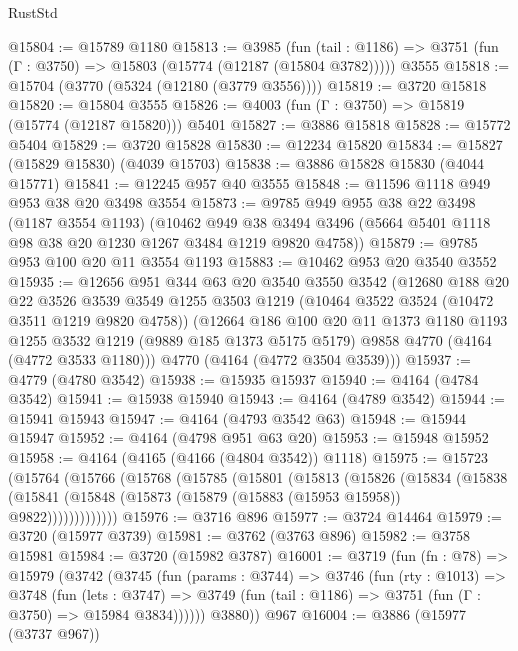 \begin{lexlean}{RustStd}
\begin{coremodule}
@15804 := @15789 @1180
@15813 := @3985
    (fun (tail : @1186) => @3751 (fun (Γ : @3750) => @15803 (@15774 (@12187 (@15804 @3782)))))
    @3555
@15818 := @15704 (@3770 (@5324 (@12180 (@3779 @3556))))
@15819 := @3720 @15818
@15820 := @15804 @3555
@15826 := @4003 (fun (Γ : @3750) => @15819 (@15774 (@12187 @15820))) @5401
@15827 := @3886 @15818
@15828 := @15772 @5404
@15829 := @3720 @15828
@15830 := @12234 @15820
@15834 := @15827 (@15829 @15830) (@4039 @15703)
@15838 := @3886 @15828 @15830 (@4044 @15771)
@15841 := @12245 @957 @40 @3555
@15848 := @11596 @1118 @949 @953 @38 @20 @3498 @3554
@15873 := @9785
    @949
    @955
    @38
    @22
    @3498
    (@1187 @3554 @1193)
    (@10462
      @949
      @38
      @3494
      @3496
      (@5664 @5401 @1118 @98 @38 @20 @1230 @1267 @3484 @1219 @9820 @4758))
@15879 := @9785 @953 @100 @20 @11 @3554 @1193
@15883 := @10462 @953 @20 @3540 @3552
@15935 := @12656
    @951
    @344
    @63
    @20
    @3540
    @3550
    @3542
    (@12680
      @188
      @20
      @22
      @3526
      @3539
      @3549
      @1255
      @3503
      @1219
      (@10464 @3522 @3524 (@10472 @3511 @1219 @9820 @4758))
      (@12664
        @186
        @100
        @20
        @11
        @1373
        @1180
        @1193
        @1255
        @3532
        @1219
        (@9889 @185 @1373 @5175 @5179)
        @9858
        @4770
        (@4164 (@4772 @3533 @1180)))
      @4770
      (@4164 (@4772 @3504 @3539)))
@15937 := @4779 (@4780 @3542)
@15938 := @15935 @15937
@15940 := @4164 (@4784 @3542)
@15941 := @15938 @15940
@15943 := @4164 (@4789 @3542)
@15944 := @15941 @15943
@15947 := @4164 (@4793 @3542 @63)
@15948 := @15944 @15947
@15952 := @4164 (@4798 @951 @63 @20)
@15953 := @15948 @15952
@15958 := @4164 (@4165 (@4166 (@4804 @3542)) @1118)
@15975 := @15723
    (@15764
      (@15766
        (@15768
          (@15785
            (@15801
              (@15813
                (@15826
                  (@15834
                    (@15838
                      (@15841 (@15848 (@15873 (@15879 (@15883 (@15953 @15958)) @9822)))))))))))))
@15976 := @3716 @896
@15977 := @3724 @14464
@15979 := @3720 (@15977 @3739)
@15981 := @3762 (@3763 @896)
@15982 := @3758 @15981
@15984 := @3720 (@15982 @3787)
@16001 := @3719
    (fun (fn : @78) =>
    @15979
      (@3742
        (@3745
          (fun (params : @3744) =>
          @3746
            (fun (rty : @1013) =>
            @3748
              (fun (lets : @3747) =>
              @3749 (fun (tail : @1186) => @3751 (fun (Γ : @3750) => @15984 @3834))))))
        @3880))
    @967
@16004 := @3886 (@15977 (@3737 @967))

\end{coremodule}
\end{lexlean}
